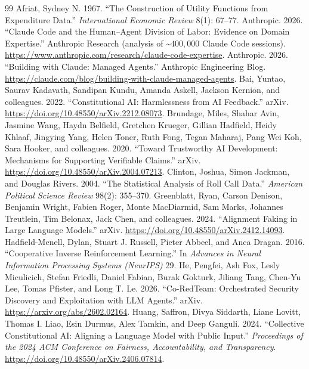 \documentclass[11pt]{article}
\begin{document}
\begin{thebibliography}{99}
 Afriat, Sydney N. 1967. ``The Construction of Utility Functions from Expenditure Data.'' \emph{International Economic Review} 8(1): 67--77.
 Anthropic. 2026. ``Claude Code and the Human--Agent Division of Labor: Evidence on Domain Expertise.'' Anthropic Research (analysis of \textasciitilde$400{,}000$ Claude Code sessions). \url{https://www.anthropic.com/research/claude-code-expertise}.
 Anthropic. 2026. ``Building with Claude: Managed Agents.'' Anthropic Engineering Blog. \url{https://claude.com/blog/building-with-claude-managed-agents}.
 Bai, Yuntao, Saurav Kadavath, Sandipan Kundu, Amanda Askell, Jackson Kernion, and colleagues. 2022. ``Constitutional AI: Harmlessness from AI Feedback.'' arXiv. \url{https://doi.org/10.48550/arXiv.2212.08073}.
 Brundage, Miles, Shahar Avin, Jasmine Wang, Haydn Belfield, Gretchen Krueger, Gillian Hadfield, Heidy Khlaaf, Jingying Yang, Helen Toner, Ruth Fong, Tegan Maharaj, Pang Wei Koh, Sara Hooker, and colleagues. 2020. ``Toward Trustworthy AI Development: Mechanisms for Supporting Verifiable Claims.'' arXiv. \url{https://doi.org/10.48550/arXiv.2004.07213}.
 Clinton, Joshua, Simon Jackman, and Douglas Rivers. 2004. ``The Statistical Analysis of Roll Call Data.'' \emph{American Political Science Review} 98(2): 355--370.
 Greenblatt, Ryan, Carson Denison, Benjamin Wright, Fabien Roger, Monte MacDiarmid, Sam Marks, Johannes Treutlein, Tim Belonax, Jack Chen, and colleagues. 2024. ``Alignment Faking in Large Language Models.'' arXiv. \url{https://doi.org/10.48550/arXiv.2412.14093}.
 Hadfield-Menell, Dylan, Stuart J. Russell, Pieter Abbeel, and Anca Dragan. 2016. ``Cooperative Inverse Reinforcement Learning.'' In \emph{Advances in Neural Information Processing Systems (NeurIPS)} 29.
 He, Pengfei, Ash Fox, Lesly Miculicich, Stefan Friedli, Daniel Fabian, Burak Gokturk, Jiliang Tang, Chen-Yu Lee, Tomas Pfister, and Long T. Le. 2026. ``Co-RedTeam: Orchestrated Security Discovery and Exploitation with LLM Agents.'' arXiv. \url{https://arxiv.org/abs/2602.02164}.
 Huang, Saffron, Divya Siddarth, Liane Lovitt, Thomas I. Liao, Esin Durmus, Alex Tamkin, and Deep Ganguli. 2024. ``Collective Constitutional AI: Aligning a Language Model with Public Input.'' \emph{Proceedings of the 2024 ACM Conference on Fairness, Accountability, and Transparency}. \url{https://doi.org/10.48550/arXiv.2406.07814}.

\end{thebibliography}
\end{document}
